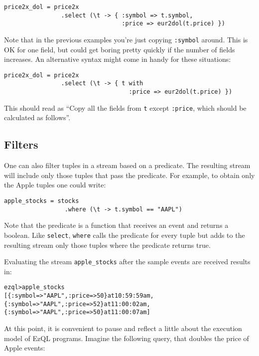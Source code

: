 \documentclass{report}
\newenvironment{evaluation}
{
  \framed
  \begin{alltt}
}
{
  \end{alltt}
  \endframed
}
\begin{document}
\pagebreak
\begin{verbatim}
price2x_dol = price2x
                .select (\t -> { :symbol => t.symbol,
                                 :price => eur2dol(t.price) })
\end{verbatim}

Note that in the previous examples you're just copying \verb=:symbol=
around. This is OK for one field, but could get boring pretty quickly
if the number of fields increases. An alternative syntax might come in
handy for these situations:

\begin{verbatim}
price2x_dol = price2x
                .select (\t -> { t with
                                   :price => eur2dol(t.price) })
\end{verbatim}

This should read as ``Copy all the fields from \verb=t= except
\verb=:price=, which should be calculated as follows''.

\subsection{Filters}
\label{sec:filters}

One can also filter tuples in a stream based on a predicate. The
resulting stream will include only those tuples that pass the
predicate. For example, to obtain only the Apple tuples one could
write:

\begin{verbatim}
apple_stocks = stocks
                 .where (\t -> t.symbol == "AAPL")
\end{verbatim}

Note that the predicate is a function that receives an event and
returns a boolean. Like \verb=select=, \verb=where= calls the
predicate for every tuple but adds to the resulting stream only those
tuples where the predicate returns true.

Evaluating the stream \verb=apple_stocks= after the sample events are
received results in:

\begin{evaluation}
ezql> apple_stocks
[\{ :symbol => "AAPL", :price => 50 \} at 10:59:59 am,
 \{ :symbol => "AAPL", :price => 52 \} at 11:00:02 am,
 \{ :symbol => "AAPL", :price => 50 \} at 11:00:07 am]
\end{evaluation}

At this point, it is convenient to pause and reflect a little about
the execution model of EzQL programs. Imagine the following query,
that doubles the price of Apple events:
\end{document}
